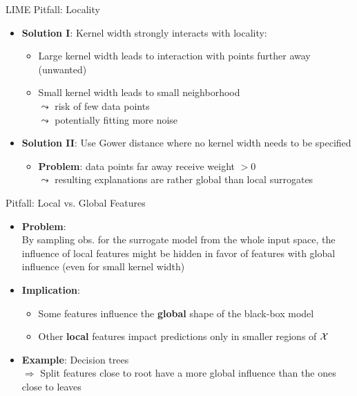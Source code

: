 \documentclass[10pt,compress,t,notes=noshow, xcolor=table]{beamer}
\begin{document}
\begin{frame}[c]{LIME Pitfall: Locality }
    \begin{itemize} 
         \item \textbf{Solution I}: Kernel width strongly interacts with locality:
         \begin{itemize}
             \item Large kernel width leads to interaction with points further away (unwanted)
             \item Small kernel width leads to small neighborhood\\
             $\leadsto$ risk of few data points\\
             $\leadsto$ potentially fitting more noise
         \end{itemize}
         \pause
    	\item \textbf{Solution II}: Use Gower distance where no kernel width needs to be specified 
    	\begin{itemize}
    	    \item \textbf{Problem}: data points far away receive weight $ > 0$\\
    	    $\leadsto$ resulting explanations are rather global than local surrogates   
    	\end{itemize}
    \end{itemize}
\vspace{0.3cm}

\end{frame}

\begin{frame}[c]{Pitfall: Local vs. Global Features }

\begin{itemize}%
	\item<1-> \textbf{Problem}: \\
	By sampling obs. for the surrogate model from the whole input space, the influence of local features might be hidden in favor of features with global influence (even for small kernel width)
	\item<2-> \textbf{Implication}: 
	\begin{itemize}
	    \item Some features influence the \textbf{global} shape of the black-box model
	    \item Other \textbf{local} features impact predictions only in smaller regions of $\mathcal{X}$ %
	\end{itemize}
	\item<3-> \textbf{Example}: Decision trees\\
	$\Rightarrow$ Split features close to root have a more global influence than the ones close to leaves
\end{itemize}

\end{frame}
\end{document}
